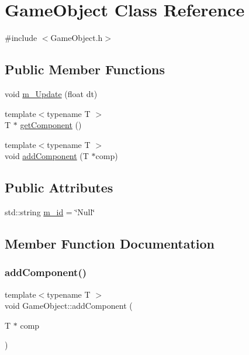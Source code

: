 \hypertarget{class_game_object}{}\section{Game\+Object Class Reference}
\label{class_game_object}


{\ttfamily \#include $<$Game\+Object.\+h$>$}

\subsection*{Public Member Functions}
\begin{DoxyCompactItemize}
\item 
void \mbox{\hyperlink{class_game_object_a3fcc5b3f446a2f8fe7c2943db2714750}{m\+\_\+\+Update}} (float dt)
\item 
{\footnotesize template$<$typename T $>$ }\\T $\ast$ \mbox{\hyperlink{class_game_object_a1c50376c7f24439359a3962f57dfd513}{get\+Component}} ()
\item 
{\footnotesize template$<$typename T $>$ }\\void \mbox{\hyperlink{class_game_object_aff400b6c6e3c6af0b42fe49adb786174}{add\+Component}} (T $\ast$comp)
\end{DoxyCompactItemize}
\subsection*{Public Attributes}
\begin{DoxyCompactItemize}
\item 
std\+::string \mbox{\hyperlink{class_game_object_a31bee32d6133a448517e33704be97047}{m\+\_\+id}} = \char`\"{}Null\char`\"{}
\end{DoxyCompactItemize}


\subsection{Member Function Documentation}
\mbox{\label{class_game_object_aff400b6c6e3c6af0b42fe49adb786174}} 
\subsubsection{\texorpdfstring{add\+Component()}{addComponent()}}
{\footnotesize\ttfamily template$<$typename T $>$ \\
void Game\+Object\+::add\+Component (\begin{DoxyParamCaption}\item[{T $\ast$}]{comp }\end{DoxyParamCaption})\hspace{0.3cm}{\ttfamily [inline]}}

